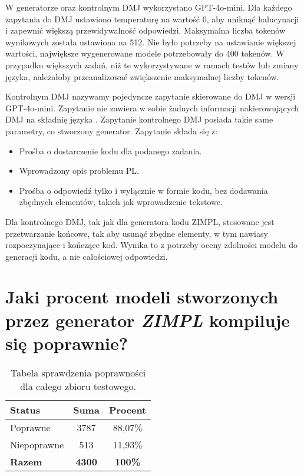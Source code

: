 W generatorze oraz kontrolnym DMJ wykorzystano GPT-4o-mini. Dla każdego zapytania do DMJ ustawiono temperaturę na wartość 0, aby uniknąć halucynacji i zapewnić większą przewidywalność odpowiedzi. Maksymalna liczba tokenów wynikowych została ustawiona na 512. Nie było potrzeby na ustawianie większej wartości, największe wygenerowane modele potrzebowały do 400 tokenów. W przypadku większych zadań, niż te wykorzystywane w ramach testów lub zmiany języka, należałoby przeanalizować zwiększenie maksymalnej liczby tokenów.


Kontrolnym DMJ nazywamy pojedyncze zapytanie skierowane do DMJ w wersji GPT-4o-mini. Zapytanie nie zawiera w sobie żadnych informacji nakierowujących DMJ na składnię języka . Zapytanie kontrolnego DMJ posiada takie same parametry, co stworzony generator. Zapytanie składa się z:

\begin{itemize}
    \item Prośba o dostarczenie kodu  dla podanego zadania.
    \item Wprowadzony opis problemu PL.
    \item Prośba o odpowiedź tylko i wyłącznie w formie kodu, bez dodawania zbędnych elementów, takich jak wprowadzenie tekstowe.
\end{itemize}

Dla kontrolnego DMJ, tak jak dla generatora kodu ZIMPL, stosowane jest przetwarzanie końcowe, tak aby usunąć zbędne elementy, w tym nawiasy rozpoczynające i kończące kod. Wynika to z potrzeby oceny zdolności modelu do generacji kodu, a nie całościowej odpowiedzi.

\section{Jaki procent modeli stworzonych przez generator  \textit{ZIMPL} kompiluje się poprawnie?}

\begin{table}[H]
\caption{Tabela sprawdzenia poprawności dla całego zbioru testowego.}\label{tab:experiment:compilation}
\centering%
\begin{tabular}{|l|c|c|}
\hline
\textbf{Status} & \textbf{Suma} & \textbf{Procent} \\
\hline
Poprawne & 3787 & 88,07\% \\
\hline
Niepoprawne & 513 & 11,93\% \\
\hline
\textbf{Razem} & \textbf{4300} & \textbf{100\%} \\
\hline
\end{tabular}
\end{table}

